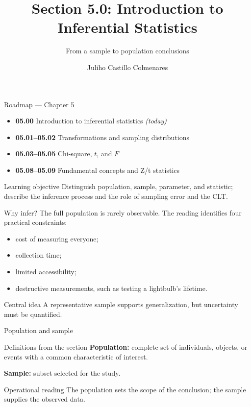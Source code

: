 \documentclass[10pt,aspectratio=169]{beamer}
\title[Introduction to Inferential Statistics]{Section 5.0: Introduction to Inferential Statistics}
\subtitle{From a sample to population conclusions}
\author[J. Castillo Colmenares]{Juliho Castillo Colmenares}
\institute{Tecnológico de Monterrey}
\date{}
\begin{document}
\begin{frame}[plain]\vspace{-0.8cm}\titlepage\end{frame}

\begin{frame}{Roadmap --- Chapter 5}
  \footnotesize
  \begin{itemize}\itemsep=0.08cm
    \item \textbf{05.00} Introduction to inferential statistics \emph{(today)}
    \item \textbf{05.01--05.02} Transformations and sampling distributions
    \item \textbf{05.03--05.05} Chi-square, $t$, and $F$
    \item \textbf{05.08--05.09} Fundamental concepts and Z/t statistics
  \end{itemize}
  \begin{block}{Learning objective}
    Distinguish population, sample, parameter, and statistic; describe the
    inference process and the role of sampling error and the CLT.
  \end{block}
\end{frame}

\begin{frame}{Why infer?}
  \footnotesize
  The full population is rarely observable. The reading identifies four
  practical constraints:
  \begin{itemize}\itemsep=0.1cm
    \item cost of measuring everyone;
    \item collection time;
    \item limited accessibility;
    \item destructive measurements, such as testing a lightbulb's lifetime.
  \end{itemize}
  \begin{alertblock}{Central idea}
    A representative sample supports generalization, but uncertainty must be
    quantified.
  \end{alertblock}
\end{frame}

\begin{frame}{Population and sample}
  \footnotesize
  \begin{block}{Definitions from the section}
    \textbf{Population:} complete set of individuals, objects, or events with a
    common characteristic of interest.

    \medskip
    \textbf{Sample:} subset selected for the study.
  \end{block}
  \begin{exampleblock}{Operational reading}
    The population sets the scope of the conclusion; the sample supplies the
    observed data.
  \end{exampleblock}
\end{frame}
\end{document}
